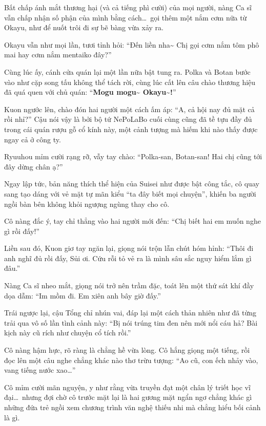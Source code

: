 \documentclass[../main.tex]{subfiles}
\begin{document}
Bất chấp ánh mắt thương hại (và cả tiếng phì cười) của mọi người, nàng Ca sĩ vẫn chấp nhận số phận của mình bằng cách\dots\ gọi thêm một nắm cơm nữa từ Okayu, như để nuốt trôi đi sự bẽ bàng vừa xảy ra.

Okayu vẫn như mọi lần, tươi tỉnh hỏi: ``Đến liền nha\~{} Chị gọi cơm nắm tôm phô mai hay cơm nắm mentaiko đây?''

\ct

Cùng lúc ấy, cánh cửa quán lại một lần nữa bật tung ra. Polka và Botan bước vào như cặp song tấu không thể tách rời, cùng lúc cất lên câu chào thương hiệu đã quá quen với chủ quán: ``\textbf{Mogu mogu\~{} Okayu\~{}!}''


Kuon ngước lên, chào đón hai người một cách ấm áp: ``A, cả hội nay đủ mặt cả rồi nhỉ?'' Cậu nói vậy là bởi bộ tứ NePoLaBo cuối cùng cũng đã tề tựu đầy đủ trong cái quán rượu gỗ cổ kính này, một cảnh tượng mà hiếm khi nào thấy được ngay cả ở công ty.

Ryuuhou mỉm cười rạng rỡ, vẫy tay chào: ``Polka-san, Botan-san! Hai chị cũng tới đây dừng chân ạ?''

Ngay lập tức, bản năng thích thể hiện của Suisei như được bật công tắc, cô quay sang tạo dáng với vẻ mặt tự mãn kiểu ``ta đây biết mọi chuyện'', khiến ba người ngồi bàn bên không khỏi ngượng ngùng thay cho cô.

Cô nàng đắc ý, tay chỉ thẳng vào hai người mới đến: ``Chị biết hai em muốn nghe gì rồi đấy!''

Liền sau đó, Kuon giơ tay ngăn lại, giọng nói trộn lẫn chút hóm hỉnh: ``Thôi đi anh nghĩ đủ rồi đấy, Sủi ơi. Cứu rỗi tỏ vẻ ra là mình sâu sắc nguy hiểm lắm gì đâu.''

Nàng Ca sĩ nheo mắt, giọng nói trở nên trầm đặc, toát lên một thứ sát khí đầy dọa dẫm: ``Im mồm đi. Em xiên anh bây giờ đấy.''

Trái ngược lại, cậu Tổng chỉ nhún vai, đáp lại một cách thản nhiên như đã từng trải qua vô số lần tình cảnh này: ``Bị nói trúng tim đen nên mới nổi cáu hả? Bài kịch này cũ rích như chuyện cổ tích rồi.''

Cô nàng hậm hực, rõ ràng là chẳng hề vừa lòng. Cô hắng giọng một tiếng, rồi đọc lên một câu nghe chẳng khác nào thơ trừu tượng: ``Ao cũ, con ếch nhảy vào, vang tiếng nước xao\dots''

Cô mỉm cười mãn nguyện, y như rằng vừa truyền đạt một chân lý triết học vĩ đại\dots\ nhưng đợi chờ cô trước mặt lại là hai gương mặt ngẩn ngơ chẳng khác gì những đứa trẻ ngồi xem chương trình văn nghệ thiếu nhi mà chẳng hiểu bối cảnh là gì.
\end{document}
